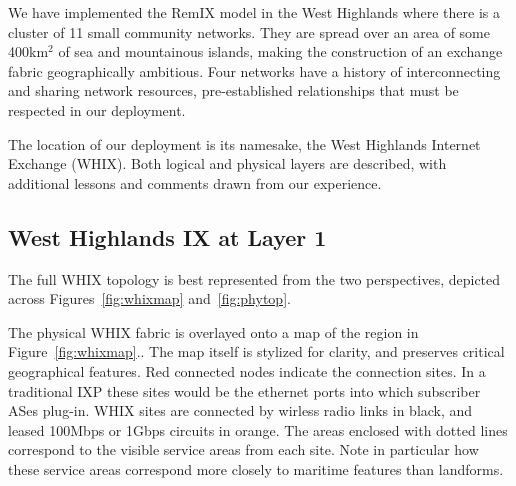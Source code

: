 
We have implemented the RemIX model in the West Highlands where there
is a cluster of
11 small community networks. They are spread over an area of some 400km$^2$
 of sea and mountainous islands, making the
construction of an exchange fabric geographically ambitious. Four networks have
a history of interconnecting and sharing network resources, pre-established
relationships that must be respected in our deployment.

The location of our deployment is its namesake, the West Highlands Internet
Exchange (WHIX). Both logical and physical layers are described, with
additional lessons and comments drawn from our experience.



\subsection{West Highlands IX at Layer 1}

The full WHIX topology is best represented from the two perspectives, depicted
across Figures~\ref{fig:whixmap} and~\ref{fig:phytop}.

The physical WHIX fabric is overlayed onto a map of the region in
Figure~\ref{fig:whixmap}.. The map itself is stylized for clarity, and preserves
critical geographical features. Red connected nodes indicate the connection
sites. In a traditional IXP these sites would be the ethernet ports into which
subscriber ASes plug-in. WHIX sites are connected by wirless radio links in
black, and leased 100Mbps or 1Gbps circuits in orange. The areas enclosed with
dotted lines correspond to the visible service areas from each site.
 Note in particular how these service areas
correspond more  closely to maritime features than landforms.

